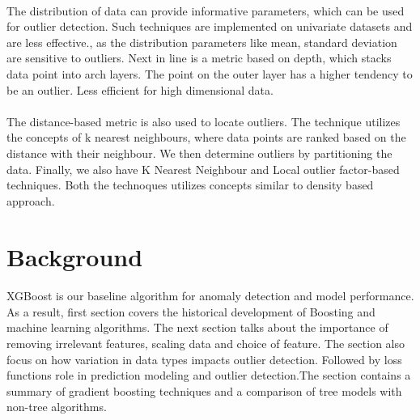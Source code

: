 \documentclass[runningheads]{llncs}
\begin{document}
\paragraph{} The distribution of data can provide informative parameters,  which can be used for outlier detection. Such techniques are implemented on univariate datasets and are less effective., as the distribution parameters like mean, standard deviation are sensitive to outliers. 
Next in line is a metric based on depth, which stacks data point into arch layers. The point on the outer layer has a higher tendency to be an outlier. Less efficient for high dimensional data.

\paragraph{} The distance-based metric is also used to locate outliers. The technique utilizes the concepts of k nearest neighbours, where data points are ranked based on the distance with their neighbour. We then determine outliers by partitioning the data.  Finally, we also have K Nearest Neighbour and Local outlier factor-based techniques. Both the technoques utilizes concepts similar to density based approach.







\section{Background}
\paragraph{} XGBoost is our baseline algorithm for anomaly detection and model performance. As a result, first section covers the historical development of Boosting and machine learning algorithms. The next section talks about the importance of removing irrelevant features, scaling data and choice of feature. The section also focus on how variation in data types impacts outlier detection. Followed by loss functions role in prediction modeling and outlier detection.The section contains a summary of gradient boosting techniques and a comparison of tree models with non-tree algorithms.
\end{document}
